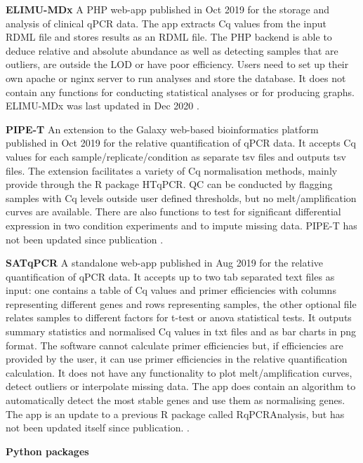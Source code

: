 \documentclass[../main.tex]{subfiles}
\begin{document}
\textbf{ELIMU-MDx} A PHP web-app published in Oct 2019 for the storage and analysis of clinical qPCR data. 
The app extracts Cq values from the input RDML file and stores results as an RDML file. 
The PHP backend is able to deduce relative and absolute abundance as well as detecting samples that are outliers, are outside the LOD or have poor efficiency. 
Users need to set up their own apache or nginx server to run analyses and store the database. 
It does not contain any functions for conducting statistical analyses or for producing graphs. ELIMU-MDx was last updated in Dec 2020 \parencite{Krahenbuhl2019}.

\textbf{PIPE-T} An extension to the Galaxy web-based bioinformatics platform published in Oct 2019 for the relative quantification of qPCR data. 
It accepts Cq values for each sample/replicate/condition as separate tsv files and outputs tsv files. 
The extension facilitates a variety of Cq normalisation methods, mainly provide through the R package HTqPCR. 
QC can be conducted by flagging samples with Cq levels outside user defined thresholds, but no melt/amplification curves are available. 
There are also functions to test for significant differential expression in two condition experiments and to impute missing data. 
PIPE-T has not been updated since publication \parencite{Zanardi2019}.

\textbf{SATqPCR} A standalone web-app published in Aug 2019 for the relative quantification of qPCR data. 
It accepts up to two tab separated text files as input: one contains a table of Cq values and primer efficiencies with columns representing different genes and rows representing samples, the other optional file relates samples to different factors for t-test or anova statistical tests. 
It outputs summary statistics and normalised Cq values in txt files and as bar charts in png format. 
The software cannot calculate primer efficiencies but, if efficiencies are provided by the user, it can use primer efficiencies in the relative quantification calculation. 
It does not have any functionality to plot melt/amplification curves, detect outliers or interpolate missing data. 
The app does contain an algorithm to automatically detect the most stable genes and use them as normalising genes. 
The app is an update to a previous R package called RqPCRAnalysis, but has not been updated itself since publication. \parencite{Rancurel2019}.


\textbf{Python packages}
\end{document}
